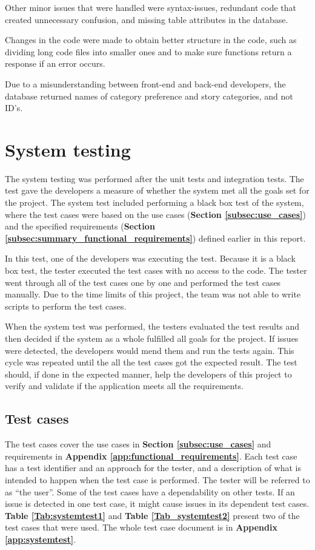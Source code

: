 Other minor issues that were handled were syntax-issues, redundant code that created unnecessary confusion, and missing table attributes in the database.\newline

Changes in the code were made to obtain better structure in the code, such as dividing long code files into smaller ones and to make sure functions return a response if an error occurs. \newline

Due to a misunderstanding between front-end and back-end developers, the database returned names of category preference and story categories, and not ID's.

\section{System testing}
The system testing was performed after the unit tests and integration tests. The test gave the developers a measure of whether the system met all the goals set for the project. The system test included performing a black box test of the system, where the test cases were based on the use cases (\textbf{Section \ref{subsec:use_cases}}) and the specified requirements (\textbf{Section \ref{subsec:summary_functional_requirements}})  defined earlier in this report. \newline

In this test, one of the developers was executing the test. Because it is a black box test, the tester executed the test cases with no access to the code. The tester went through all of the test cases one by one and performed the test cases manually. Due to the time limits of this project, the team was not able to write scripts to perform the test cases. \newline

When the system test was performed, the testers evaluated the test results and then decided if the system as a whole fulfilled all goals for the project. If issues were detected, the developers would mend them and run the tests again. This cycle was repeated until the all the test cases got the expected result. The test should, if done in the expected manner, help the developers of this project to verify and validate if the application meets all the requirements.

\subsection{Test cases}
The test cases cover the use cases in \textbf{Section \ref{subsec:use_cases}} and requirements in \textbf{Appendix \ref{app:functional_requirements}}. 
Each test case has a test identifier and an approach for the tester, and a description of what is intended to happen when the test case is performed. The tester will be referred to as “the user”. 
Some of the test cases have a dependability on other tests. If an issue is detected in one test case, it might cause issues in its dependent test cases. \textbf{Table \ref{Tab:systemtest1}} and \textbf{Table \ref{Tab_systemtest2}} present two of the test cases that were used. The whole test case document is in \textbf{Appendix \ref{app:systemtest}}. 

